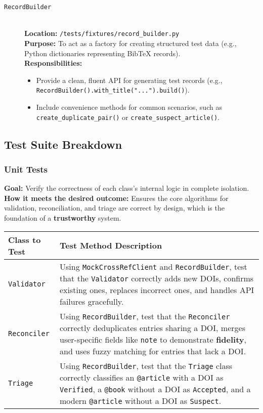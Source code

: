 \documentclass[11pt, a4paper]{article}
\begin{document}
\begin{description}
    \item[\texttt{RecordBuilder}] \hfill \\
    \textbf{Location:} \texttt{/tests/fixtures/record\_builder.py} \\
    \textbf{Purpose:} To act as a factory for creating structured test data (e.g., Python dictionaries representing BibTeX records). \\
    \textbf{Responsibilities:}
    \begin{itemize}[leftmargin=*]
        \item Provide a clean, fluent API for generating test records (e.g., \texttt{RecordBuilder().with\_title("...").build()}).
        \item Include convenience methods for common scenarios, such as \texttt{create\_duplicate\_pair()} or \texttt{create\_suspect\_article()}.
    \end{itemize}
\end{description}

\subsection{Test Suite Breakdown}
\subsubsection{Unit Tests}
\textbf{Goal:} Verify the correctness of each class’s internal logic in complete isolation. \\
\textbf{How it meets the desired outcome:} Ensures the core algorithms for validation, reconciliation, and triage are correct by design, which is the foundation of a \textbf{trustworthy} system.

\begin{table}[h!]
\centering
\begin{tabular}{lp{}}
\toprule
\textbf{Class to Test} & \textbf{Test Method Description} \\
\midrule
\texttt{Validator} &
Using \texttt{MockCrossRefClient} and \texttt{RecordBuilder}, test that the \texttt{Validator} correctly adds new DOIs, confirms existing ones, replaces incorrect ones, and handles API failures gracefully. \\
\addlinespace
\texttt{Reconciler} &
Using \texttt{RecordBuilder}, test that the \texttt{Reconciler} correctly deduplicates entries sharing a DOI, merges user-specific fields like \texttt{note} to demonstrate \textbf{fidelity}, and uses fuzzy matching for entries that lack a DOI. \\
\addlinespace
\texttt{Triage} &
Using \texttt{RecordBuilder}, test that the \texttt{Triage} class correctly classifies an \texttt{@article} with a DOI as \texttt{Verified}, a \texttt{@book} without a DOI as \texttt{Accepted}, and a modern \texttt{@article} without a DOI as \texttt{Suspect}. \\
\bottomrule
\end{tabular}
\end{table}
\end{document}
